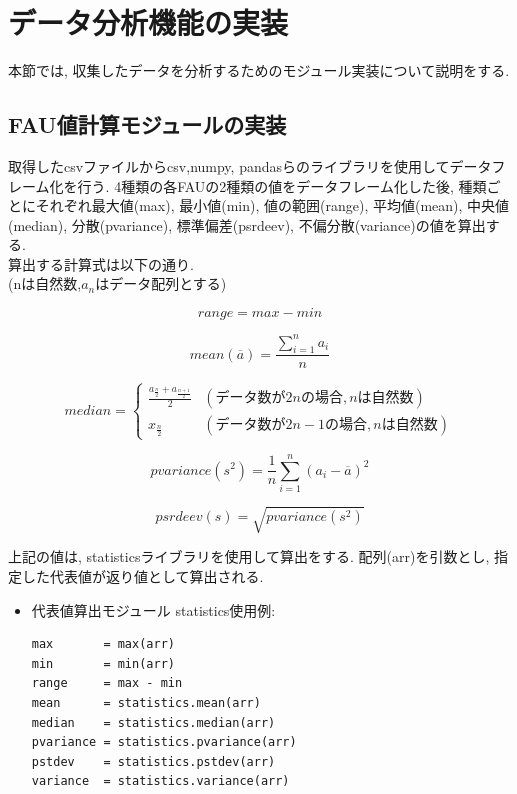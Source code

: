 \section{データ分析機能の実装}
本節では, 収集したデータを分析するためのモジュール実装について説明をする.
\subsection{FAU値計算モジュールの実装}
取得したcsvファイルからcsv,numpy, pandasらのライブラリを使用してデータフレーム化を行う.
4種類の各FAUの2種類の値をデータフレーム化した後, 種類ごとにそれぞれ最大値(max), 最小値(min), 値の範囲(range), 平均値(mean), 中央値(median), 分散(pvariance), 標準偏差(psrdeev), 不偏分散(variance)の値を算出する.\\
算出する計算式は以下の通り.\\
(nは自然数,$a_{n}$はデータ配列とする)

\begin{equation}
\label{range}
range  = max - min
\end{equation}

\begin{equation}
\label{mean}
mean( \overline{a})  =  \frac{\sum_{i=1}^n a_i}{n}
\end{equation}

  \begin{equation}
    \label{median}
    median = \left\{ \begin{array}{ll}
    \frac{a_\frac{n}{2} + a_\frac{n+1}{2} }{2} & (データ数が2nの場合,nは自然数) \\
    x_\frac{n}{2} & (データ数が2n-1の場合,nは自然数)
    \end{array} \right.\end{equation}

\begin{equation}
\label{pvariance}
pvariance(s^2)  =  \frac{1}{n} \sum_{i=1}^n (a_i - \overline{a})^2
\end{equation}


\begin{equation}
\label{pvariance}
psrdeev(s)  =  \sqrt{pvariance(s^2)}
\end{equation}

上記の値は, statisticsライブラリを使用して算出をする.
配列(arr)を引数とし, 指定した代表値が返り値として算出される.

\begin{itemize}
\item 代表値算出モジュール statistics使用例:
\begin{lstlisting}
max       = max(arr)
min       = min(arr)
range     = max - min
mean      = statistics.mean(arr)
median    = statistics.median(arr)
pvariance = statistics.pvariance(arr)
pstdev    = statistics.pstdev(arr)
variance  = statistics.variance(arr)
\end{lstlisting}
\end{itemize}

